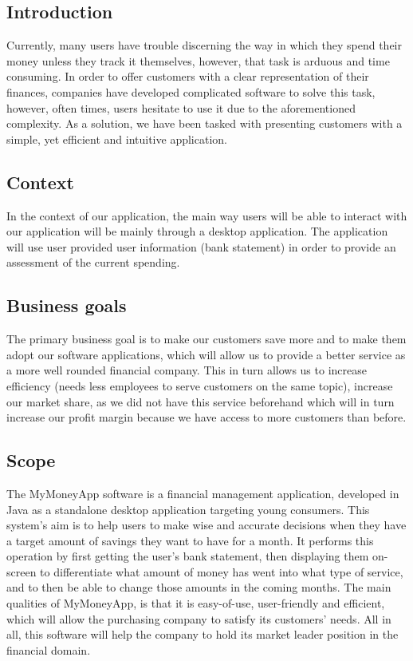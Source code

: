 \documentclass[letterpaper]{article}
\begin{document}
	\subsection{Introduction}
	
		Currently, many users have trouble discerning the way in which they spend their money unless they track it themselves, however, that task is arduous and time consuming. In order to offer customers with a clear representation of their finances, companies have developed complicated software to solve this task, however, often times, users hesitate to use it due to the aforementioned complexity. As a solution, we have been tasked with presenting customers with a simple, yet efficient and intuitive application.
	
	\subsection{Context}
	
		In the context of our application, the main way users will be able to interact with our application will be mainly through a desktop application. The application will use user provided user information (bank statement) in order to provide an assessment of the current spending.
	
	\subsection{Business goals}
	
		The primary business goal is to make our customers save more and to make them adopt our software applications, which will allow us to provide a better service as a more well rounded financial company. This in turn allows us to increase efficiency (needs less employees to serve customers on the same topic), increase our market share, as we did not have this service beforehand which will in turn increase our profit margin because we have access to more customers than before.
	
	\subsection{Scope}
	
		The MyMoneyApp software is a financial management application, developed in Java as a standalone desktop application targeting young consumers. This system’s aim is to help users to make wise and accurate decisions when they have a target amount of savings they want to have for a month. It performs this operation by first getting the user’s bank statement, then displaying them on-screen to differentiate what amount of money has went into what type of service, and to then be able to change those amounts in the coming months. The main qualities of MyMoneyApp, is that it is easy-of-use, user-friendly and efficient, which will allow the purchasing company to satisfy its customers’ needs. All in all, this software will help the company to hold its market leader position in the financial domain.
	
\end{document}

